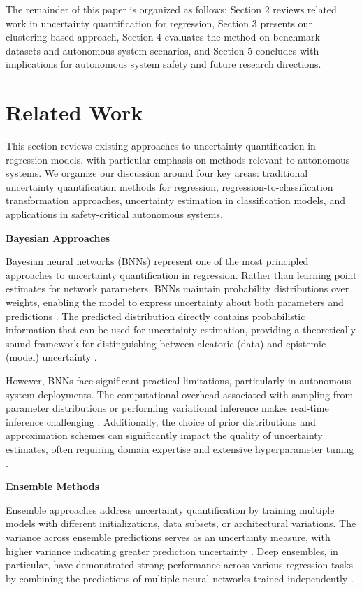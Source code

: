 The remainder of this paper is organized as follows: Section 2 reviews related work in uncertainty quantification for regression, Section 3 presents our clustering-based approach, Section 4 evaluates the method on benchmark datasets and autonomous system scenarios, and Section 5 concludes with implications for autonomous system safety and future research directions.


\section{Related Work}

This section reviews existing approaches to uncertainty quantification in regression models, with particular emphasis on methods relevant to autonomous systems. We organize our discussion around four key areas: traditional uncertainty quantification methods for regression, regression-to-classification transformation approaches, uncertainty estimation in classification models, and applications in safety-critical autonomous systems.

\textbf{Bayesian Approaches}

Bayesian neural networks (BNNs) represent one of the most principled approaches to uncertainty quantification in regression. Rather than learning point estimates for network parameters, BNNs maintain probability distributions over weights, enabling the model to express uncertainty about both parameters and predictions \cite{dunger2025uncertainties}. The predicted distribution directly contains probabilistic information that can be used for uncertainty estimation, providing a theoretically sound framework for distinguishing between aleatoric (data) and epistemic (model) uncertainty \cite{gawlikowski2021survey}.

However, BNNs face significant practical limitations, particularly in autonomous system deployments. The computational overhead associated with sampling from parameter distributions or performing variational inference makes real-time inference challenging \cite{anand2025uncertainty}. Additionally, the choice of prior distributions and approximation schemes can significantly impact the quality of uncertainty estimates, often requiring domain expertise and extensive hyperparameter tuning \cite{gawlikowski2021survey}.

\textbf{Ensemble Methods}

Ensemble approaches address uncertainty quantification by training multiple models with different initializations, data subsets, or architectural variations. The variance across ensemble predictions serves as an uncertainty measure, with higher variance indicating greater prediction uncertainty \cite{dunger2025uncertainties}. Deep ensembles, in particular, have demonstrated strong performance across various regression tasks by combining the predictions of multiple neural networks trained independently \cite{wibbeke2025evaluating}.

